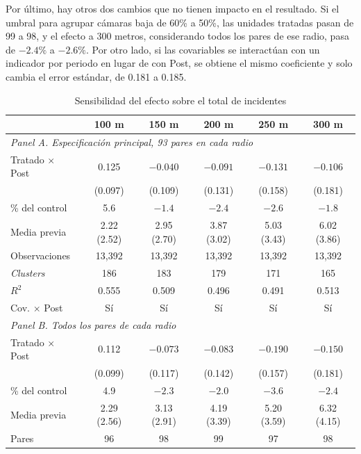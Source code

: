 Por último, hay otros dos cambios que no tienen impacto en el resultado. Si el umbral para agrupar cámaras baja de 60\% a 50\%, las unidades tratadas pasan de 99 a 98, y el efecto a 300 metros, considerando todos los pares de ese radio, pasa de $-2.4\%$ a $-2.6\%$. Por otro lado, si las covariables se interactúan con un indicador por periodo en lugar de con Post, se obtiene el mismo coeficiente y solo cambia el error estándar, de 0.181 a 0.185.

\begin{table}[htbp]
    \centering
    \caption{Sensibilidad del efecto sobre el total de incidentes}
    \label{tab:robustez}
    \scriptsize
    \setlength{\tabcolsep}{3pt}
    \renewcommand{\arraystretch}{0.9}
    \begin{tabular}{l c c c c c}
        \toprule
        & 100 m & 150 m & 200 m & 250 m & 300 m \\
        \midrule
        \multicolumn{6}{l}{\textit{Panel A. Especificación principal, 93 pares en cada radio}} \\
        Tratado $\times$ Post & 0.125 & $-0.040$ & $-0.091$ & $-0.131$ & $-0.106$ \\
         & (0.097) & (0.109) & (0.131) & (0.158) & (0.181) \\
        \% del control & 5.6 & $-1.4$ & $-2.4$ & $-2.6$ & $-1.8$ \\
        Media previa & 2.22 (2.52) & 2.95 (2.70) & 3.87 (3.02) & 5.03 (3.43) & 6.02 (3.86) \\
        Observaciones & 13,392 & 13,392 & 13,392 & 13,392 & 13,392 \\
        \emph{Clusters} & 186 & 183 & 179 & 171 & 165 \\
        $R^2$ & 0.555 & 0.509 & 0.496 & 0.491 & 0.513 \\
        Cov. $\times$ Post & Sí & Sí & Sí & Sí & Sí \\
        \midrule
        \multicolumn{6}{l}{\textit{Panel B. Todos los pares de cada radio}} \\
        Tratado $\times$ Post & 0.112 & $-0.073$ & $-0.083$ & $-0.190$ & $-0.150$ \\
         & (0.099) & (0.117) & (0.142) & (0.157) & (0.181) \\
        \% del control & 4.9 & $-2.3$ & $-2.0$ & $-3.6$ & $-2.4$ \\
        Media previa & 2.29 (2.56) & 3.13 (2.91) & 4.19 (3.39) & 5.20 (3.59) & 6.32 (4.15) \\
        Pares & 96 & 98 & 99 & 97 & 98 \\

\end{tabular}
\end{table}
